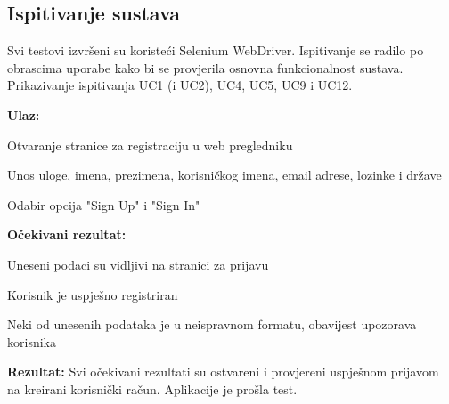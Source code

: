 			\subsection{Ispitivanje sustava}
			Svi testovi izvršeni su koristeći Selenium WebDriver. Ispitivanje se radilo po obrascima uporabe kako bi se provjerila osnovna funkcionalnost sustava. Prikazivanje ispitivanja UC1 (i UC2), UC4, UC5, UC9 i UC12.
			
			\noindent {}
			\begin{packed_item}

				\item  \textbf{Ulaz:}
				\item[] \begin{packed_enum}

					\item Otvaranje stranice za registraciju u web pregledniku
					\item Unos uloge, imena, prezimena, korisničkog imena, email adrese, lozinke i države
					\item Odabir opcija "Sign Up" i "Sign In"

				\end{packed_enum}
				
				\item  \textbf{Očekivani rezultat:}
				\item[] \begin{packed_item}
				\item[1] Uneseni podaci su vidljivi na stranici za prijavu
				\item[2.a] Korisnik je uspješno registriran
				\item[2.b] Neki od unesenih podataka je u neispravnom formatu, obavijest upozorava korisnika
				\end{packed_item}

				\item  \textbf{Rezultat:} Svi očekivani rezultati su ostvareni i provjereni uspješnom prijavom na kreirani korisnički račun. Aplikacije je prošla test.
			\end{packed_item}

